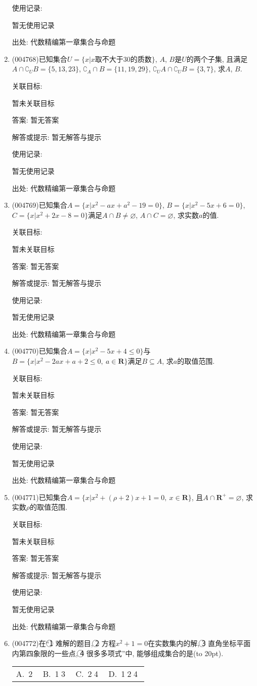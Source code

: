 \documentclass[10pt,a4paper]{article}
\newcommand{\bracket}[1]{(\hbox to #1pt{})}
\newcommand{\fourch}[4]{\par\begin{tabular}{p{.23\textwidth}p{.23\textwidth}p{.23\textwidth}p{.23\textwidth}}
A.~#1 &B.~#2& C.~#3& D.~#4
\end{tabular}}
\begin{document}
\begin{enumerate}[1.]
使用记录:

暂无使用记录


出处: 代数精编第一章集合与命题
\item { (004768)}已知集合$U =\{x|x\text{取不大于}30\text{的质数}\}$, $A$, $B$是$U$的两个子集, 且满足$A\cap \complement_UB=\{5,13,23\}$, $\complement_A\cap B=\{11,19,29\}$, $\complement_UA\cap \complement_UB=\{3,7\}$, 求$A$, $B$.


关联目标:

暂未关联目标

答案: 暂无答案

解答或提示: 暂无解答与提示

使用记录:

暂无使用记录


出处: 代数精编第一章集合与命题
\item { (004769)}已知集合$A=\{x|x^2- ax+a^2-19=0\}$, $B=\{x|x^2-5x+6=0\}$, $C=\{ x|x^2+2x-8=0\}$满足$A\cap B\ne \varnothing$, $A\cap C=\varnothing$, 求实数$a$的值.


关联目标:

暂未关联目标

答案: 暂无答案

解答或提示: 暂无解答与提示

使用记录:

暂无使用记录


出处: 代数精编第一章集合与命题
\item { (004770)}已知集合$A=\{x|x^2-5x+4\le 0\}$与$B=\{x|x^2-2ax+a+2\le 0,\ a\in \mathbf{R}\}$满足$B\subseteq A$, 求$a$的取值范围.


关联目标:

暂未关联目标

答案: 暂无答案

解答或提示: 暂无解答与提示

使用记录:

暂无使用记录


出处: 代数精编第一章集合与命题
\item { (004771)}已知集合$A=\{x|x^2 +(\rho +2)x+1=0, \ x\in \mathbf{R}\}$, 且$A\cap \mathbf{R}^+=\varnothing$, 求实数$\rho$的取值范围.


关联目标:

暂未关联目标

答案: 暂无答案

解答或提示: 暂无解答与提示

使用记录:

暂无使用记录


出处: 代数精编第一章集合与命题
\item { (004772)}在``\textcircled{1} 难解的题目, \textcircled{2} 方程$x^2+1=0$在实数集内的解, \textcircled{3} 直角坐标平面内第四象限的一些点, \textcircled{4} 很多多项式''中, 能够组成集合的是\bracket{20}.
\fourch{\textcircled{2}}{\textcircled{1}\textcircled{3}}{\textcircled{2}\textcircled{4}}{\textcircled{1}\textcircled{2}\textcircled{4}}



\end{enumerate}
\end{document}
